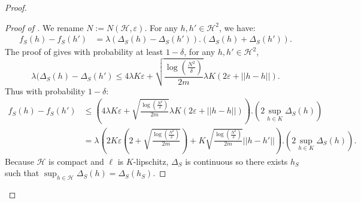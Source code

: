 \begin{noaddcontents}
\begin{proof}
\begin{proof}[Proof of ]
We rename $N:= N(\mathcal{H},\varepsilon)$.
For any $h,h'\in \mathcal{H}^2$, we have:
\begin{align*}
f_S(h)-f_S(h')  & = \lambda\left(\Delta_S(h)- \Delta_S(h')\right).\left(\Delta_S(h)+ \Delta_S(h')\right).
\end{align*}
The proof of  gives with probability at least $1-\delta$, for any $h,h'\in \mathcal{H}^2$,
\[\lambda(\Delta_S(h)-\Delta_S(h') \leq 4\lambda K \varepsilon + \sqrt{\frac{\log\left(\frac{N^2}{\delta}\right)}{2m}} \lambda K \left( 2\varepsilon+ ||h-h||\right).  \]
Thus with probability $1-\delta$:
\begin{align*}
f_S(h)-f_S(h') & \leq \left(4\lambda K \varepsilon + \sqrt{\frac{\log\left(\frac{N^2}{\delta}\right)}{2m}} \lambda K \left( 2\varepsilon+ ||h-h||\right) \right).\left(2 \sup_{h\in K} \Delta_S(h)  \right) \\
& = \lambda \left(2K\varepsilon\left( 2 + \sqrt{\frac{\log\left(\frac{N^2}{\delta}\right)}{2m}}  \right) +  K\sqrt{\frac{\log\left(\frac{N^2}{\delta}\right)}{2m}}||h-h'|| \right).\left(2 \sup_{h\in K} \Delta_S(h)  \right).
\end{align*}
Because $\mathcal{H}$ is compact and $\ell$ is $K$-lipschitz, $\Delta_S$ is continuous so there exists $h_S$ such that $\sup_{h\in \mathcal{H}} \Delta_S(h)= \Delta_S(h_S)$.
\medskip


\end{proof}
\end{proof}
\end{noaddcontents}
